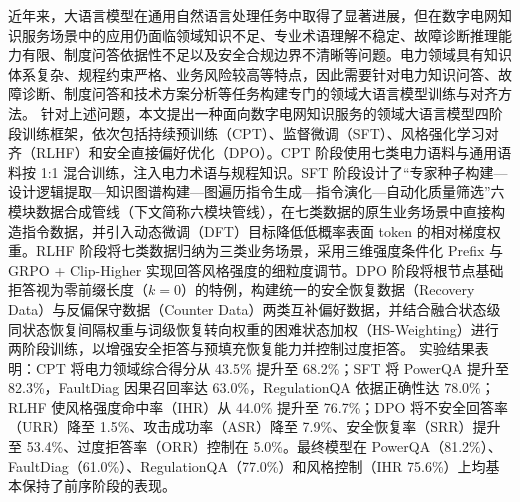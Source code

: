 \documentclass[fontset=fandol,type=master,campus=shenzhen,etitleauto=true]{hithesisbook}
\begin{document}
\frontmatter

\begin{cabstract}
近年来，大语言模型在通用自然语言处理任务中取得了显著进展，但在数字电网知识服务场景中的应用仍面临领域知识不足、专业术语理解不稳定、故障诊断推理能力有限、制度问答依据性不足以及安全合规边界不清晰等问题。电力领域具有知识体系复杂、规程约束严格、业务风险较高等特点，因此需要针对电力知识问答、故障诊断、制度问答和技术方案分析等任务构建专门的领域大语言模型训练与对齐方法。
针对上述问题，本文提出一种面向数字电网知识服务的领域大语言模型四阶段训练框架，依次包括持续预训练（CPT）、监督微调（SFT）、风格强化学习对齐（RLHF）和安全直接偏好优化（DPO）。CPT 阶段使用七类电力语料与通用语料按 1:1 混合训练，注入电力术语与规程知识。SFT 阶段设计了“专家种子构建—设计逻辑提取—知识图谱构建—图遍历指令生成—指令演化—自动化质量筛选”六模块数据合成管线（下文简称六模块管线），在七类数据的原生业务场景中直接构造指令数据，并引入动态微调（DFT）目标降低低概率表面 token 的相对梯度权重。RLHF 阶段将七类数据归纳为三类业务场景，采用三维强度条件化 Prefix 与 GRPO + Clip-Higher 实现回答风格强度的细粒度调节。DPO 阶段将根节点基础拒答视为零前缀长度（$k=0$）的特例，构建统一的安全恢复数据（Recovery Data）与反偏保守数据（Counter Data）两类互补偏好数据，并结合融合状态级同状态恢复间隔权重与词级恢复转向权重的困难状态加权（HS-Weighting）进行两阶段训练，以增强安全拒答与预填充恢复能力并控制过度拒答。
实验结果表明：CPT 将电力领域综合得分从 43.5\% 提升至 68.2\%；SFT 将 PowerQA 提升至 82.3\%，FaultDiag 因果召回率达 63.0\%，RegulationQA 依据正确性达 78.0\%；RLHF 使风格强度命中率（IHR）从 44.0\% 提升至 76.7\%；DPO 将不安全回答率（URR）降至 1.5\%、攻击成功率（ASR）降至 7.9\%、安全恢复率（SRR）提升至 53.4\%、过度拒答率（ORR）控制在 5.0\%。最终模型在 PowerQA（81.2\%）、FaultDiag（61.0\%）、RegulationQA（77.0\%）和风格控制（IHR 75.6\%）上均基本保持了前序阶段的表现。
\end{cabstract}
\end{document}

